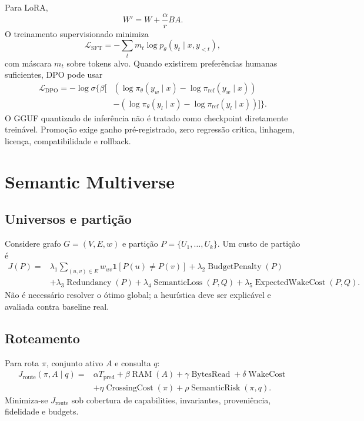 \documentclass[10pt,a4paper]{article}
\begin{document}
Para LoRA,
\begin{equation}
W'=W+\frac{\alpha}{r}BA.
\end{equation}
O treinamento supervisionado minimiza
\begin{equation}
\mathcal L_{\mathrm{SFT}}=-\sum_t m_t\log p_\theta(y_t\mid x,y_{<t}),
\end{equation}
com máscara $m_t$ sobre tokens alvo. Quando existirem preferências humanas
suficientes, DPO pode usar
\begin{align}
\mathcal L_{\mathrm{DPO}}=-\log\sigma\{\beta[&
(\log\pi_\theta(y_w\mid x)-\log\pi_{\mathrm{ref}}(y_w\mid x))\\
&-(\log\pi_\theta(y_l\mid x)-\log\pi_{\mathrm{ref}}(y_l\mid x))]\}.
\end{align}
O GGUF quantizado de inferência não é tratado como checkpoint diretamente
treinável. Promoção exige ganho pré-registrado, zero regressão crítica,
linhagem, licença, compatibilidade e rollback.

\section{Semantic Multiverse}

\subsection{Universos e partição}

Considere grafo $G=(V,E,w)$ e partição $P=\{U_1,\ldots,U_k\}$. Um custo de
partição é
\begin{align}
J(P)=&\lambda_1\sum_{(u,v)\in E}w_{uv}\mathbf1[P(u)\ne P(v)]
+\lambda_2\operatorname{BudgetPenalty}(P)\\
&+\lambda_3\operatorname{Redundancy}(P)
+\lambda_4\operatorname{SemanticLoss}(P,Q)
+\lambda_5\operatorname{ExpectedWakeCost}(P,Q).
\end{align}
Não é necessário resolver o ótimo global; a heurística deve ser explicável e
avaliada contra baseline real.

\subsection{Roteamento}

Para rota $\pi$, conjunto ativo $A$ e consulta $q$:
\begin{align}
J_{\mathrm{route}}(\pi,A\mid q)=&
\alpha T_{\mathrm{pred}}+\beta\operatorname{RAM}(A)
+\gamma\operatorname{BytesRead}+\delta\operatorname{WakeCost}\\
&+\eta\operatorname{CrossingCost}(\pi)
+\rho\operatorname{SemanticRisk}(\pi,q).
\end{align}
Minimiza-se $J_{\mathrm{route}}$ sob cobertura de capabilities, invariantes,
proveniência, fidelidade e budgets.
\end{document}
